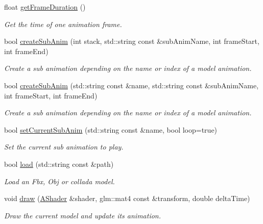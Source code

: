 \begin{DoxyCompactItemize}
float \hyperlink{classgdl_1_1_model_a145f9bb956d043c28f23d8714e72447c}{get\-Frame\-Duration} ()
\begin{DoxyCompactList}\small\item\em Get the time of one animation frame. \end{DoxyCompactList}\item 
bool \hyperlink{classgdl_1_1_model_ac903e3a9a4da067bf245a26e4bb02fd0}{create\-Sub\-Anim} (int stack, std\-::string const \&sub\-Anim\-Name, int frame\-Start, int frame\-End)
\begin{DoxyCompactList}\small\item\em Create a sub animation depending on the name or index of a model animation. \end{DoxyCompactList}\item 
bool \hyperlink{classgdl_1_1_model_aa712f9125986a0d0ee9520e73a2a0f66}{create\-Sub\-Anim} (std\-::string const \&name, std\-::string const \&sub\-Anim\-Name, int frame\-Start, int frame\-End)
\begin{DoxyCompactList}\small\item\em Create a sub animation depending on the name or index of a model animation. \end{DoxyCompactList}\item 
bool \hyperlink{classgdl_1_1_model_a7167ca64cd426f7bd46756ed33bad12f}{set\-Current\-Sub\-Anim} (std\-::string const \&name, bool loop=true)
\begin{DoxyCompactList}\small\item\em Set the current sub animation to play. \end{DoxyCompactList}\item 
bool \hyperlink{classgdl_1_1_model_a73175b246228b1a275a4cf2b59c8d5cd}{load} (std\-::string const \&path)
\begin{DoxyCompactList}\small\item\em Load an Fbx, Obj or collada model. \end{DoxyCompactList}\item 
void \hyperlink{classgdl_1_1_model_a57be549452c2bef282709fe02b0072a3}{draw} (\hyperlink{classgdl_1_1_a_shader}{A\-Shader} \&shader, glm\-::mat4 const \&transform, double delta\-Time)
\begin{DoxyCompactList}\small\item\em Draw the current model and update its animation. \end{DoxyCompactList}\end{DoxyCompactItemize}


